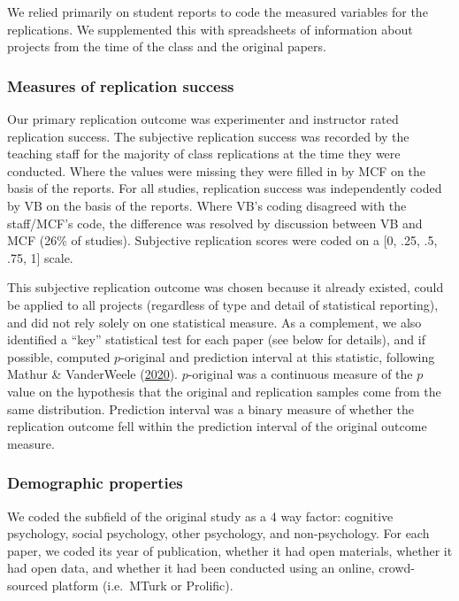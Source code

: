 \documentclass[
  english,
  a4paper,
]{article}
\begin{document}
We relied primarily on student reports to code the measured variables for the replications. We supplemented this with spreadsheets of information about projects from the time of the class and the original papers.

\hypertarget{measures-of-replication-success}{%
\subsubsection{Measures of replication success}\label{measures-of-replication-success}}

Our primary replication outcome was experimenter and instructor rated replication success. The subjective replication success was recorded by the teaching staff for the majority of class replications at the time they were conducted. Where the values were missing they were filled in by MCF on the basis of the reports. For all studies, replication success was independently coded by VB on the basis of the reports. Where VB's coding disagreed with the staff/MCF's code, the difference was resolved by discussion between VB and MCF (26\% of studies). Subjective replication scores were coded on a {[}0, .25, .5, .75, 1{]} scale.

This subjective replication outcome was chosen because it already existed, could be applied to all projects (regardless of type and detail of statistical reporting), and did not rely solely on one statistical measure. As a complement, we also identified a ``key'' statistical test for each paper (see below for details), and if possible, computed \(p\)-original and prediction interval at this statistic, following Mathur \& VanderWeele (\protect\hyperlink{ref-mathur2020}{2020}). \(p\)-original was a continuous measure of the \(p\) value on the hypothesis that the original and replication samples come from the same distribution. Prediction interval was a binary measure of whether the replication outcome fell within the prediction interval of the original outcome measure.

\hypertarget{demographic-properties}{%
\subsubsection{Demographic properties}\label{demographic-properties}}

We coded the subfield of the original study as a 4 way factor: cognitive psychology, social psychology, other psychology, and non-psychology. For each paper, we coded its year of publication, whether it had open materials, whether it had open data, and whether it had been conducted using an online, crowd-sourced platform (i.e.~MTurk or Prolific).
\end{document}
